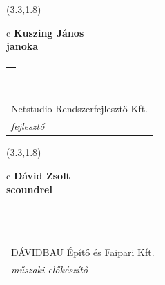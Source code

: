 \documentclass[11pt]{article}
\begin{document}
\makebox(3.3,1.8){
  \renewcommand\arraystretch{1.3}
  \begin{tabular}[c]{c}
    \hspace{8.5mm}
    \LARGE\bf{ Kuszing János }\\
    \hspace{8.5mm}
    \Large{ janoka }\\
    \renewcommand\arraystretch{3}
    \begin{tabular}[c]{c}
      \centering
      \fontfamily{phv}\selectfont{
        \textbf{
          \textsc{
            \scriptsize{
            \color{Bright}{ Ismerkedő }\color{Dark}{ Webmester }\color{Dark}{ Sminkmester }\color{Dark}{ Programozó }
            }
          }
        }
      }
    \end{tabular}
    \\
    \renewcommand\arraystretch{1}
    \begin{tabular}{p{3.3in}}
      \hspace{.7cm}Netstudio Rendszerfejlesztő Kft.\\
      \hspace{.7cm}\emph{ fejlesztő }\\
    \end{tabular}
  \end{tabular}
}

\makebox(3.3,1.8){
  \renewcommand\arraystretch{1.3}
  \begin{tabular}[c]{c}
    \hspace{8.5mm}
    \LARGE\bf{ Dávid Zsolt }\\
    \hspace{8.5mm}
    \Large{ scoundrel }\\
    \renewcommand\arraystretch{3}
    \begin{tabular}[c]{c}
      \centering
      \fontfamily{phv}\selectfont{
        \textbf{
          \textsc{
            \scriptsize{
            \color{Dark}{ Ismerkedő }\color{Bright}{ Webmester }\color{Bright}{ Sminkmester }\color{Bright}{ Programozó }
            }
          }
        }
      }
    \end{tabular}
    \\
    \renewcommand\arraystretch{1}
    \begin{tabular}{p{3.3in}}
      \hspace{.7cm}DÁVIDBAU Építő és Faipari Kft.\\
      \hspace{.7cm}\emph{ műszaki előkészítő }\\
    \end{tabular}
  \end{tabular}
}
\end{document}
